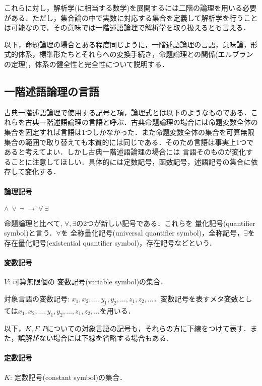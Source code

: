 \documentclass{ltjsarticle}
\theoremstyle{mystyle1}
\theoremstyle{mystyle3}
\theoremstyle{mystyle2}
\newcommand{\red}[1]{{\color{red} #1}}
\begin{document}
これらに対し，解析学(に相当する数学)を展開するには二階の論理を用いる必要がある．ただし，集合論の中で実数に対応する集合を定義して解析学を行うことは可能なので，その意味では一階述語論理で解析学を取り扱えるとも言える．

以下，命題論理の場合とある程度同じように，一階述語論理の言語，意味論，形式的体系，標準形たちとそれらへの変換手続き，命題論理との関係(エルブランの定理)，体系の健全性と完全性について説明する．

\subsection{一階述語論理の言語}
古典一階述語論理で使用する記号と項，論理式とは以下のようなものである．これらを古典一階述語論理の言語と呼ぶ．古典命題論理の場合には命題変数全体の集合を固定すれば言語は1つしかなかった．また命題変数全体の集合を可算無限集合の範囲で取り替えても本質的には同じである．そのため言語は事実上1つであると考えてよい．しかし古典一階述語論理の場合には\red{言語そのものが変化する}ことに注意してほしい．具体的には定数記号，函数記号，述語記号の集合に依存して変化する．

\paragraph{論理記号}
$\wedge\ \vee\ \neg\ \to\ \forall\ \exists$

命題論理と比べて, $\forall,\exists$の2つが新しい記号である．これらを\red{量化記号}(quantifier symbol)と言う．$\forall$を\red{全称量化記号}(universal quantifier symbol)，全称記号，$\exists$を\red{存在量化記号}(existential quantifier symbol)，存在記号などという．

\paragraph{変数記号}
$V$: 可算無限個の\red{変数記号}(variable symbol)の集合．

対象言語の変数記号: $\underline{x_1},\underline{x_2},\ldots,\underline{y_1},\underline{y_2},\ldots,\underline{z_1},\underline{z_2},\ldots$．変数記号を表すメタ変数としては$x_1,x_2,\ldots,y_1,y_2,\ldots,z_1,z_2,\ldots$を用いる．

以下，$K, F, P$についての対象言語の記号も，それらの方に下線をつけて表す．また，誤解がない場合には下線を省略する場合もある．

\paragraph{定数記号}
$K$: \red{定数記号}(constant symbol)の集合．
\end{document}
